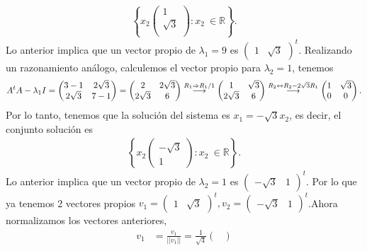 \documentclass[11pt,letterpaper]{article}
\newcommand{\mR}{\mathbb{R}}
\newcommand{\grstep}[2][\relax]{%
   \ensuremath{\mathrel{
       {\mathop{\longrightarrow}\limits^{#2\mathstrut}_{
                                     \begin{subarray}{l} #1 \end{subarray}}}}}}
\begin{document}
\begin{enumerate}
\begin{align*}
\left\{x_2\begin{pmatrix}
 1\\
 \sqrt{3}\\
\end{pmatrix}: x_2 \ \in \mR \right\}.
\end{align*}
Lo anterior implica que un vector propio de $\lambda_1=9$ es 
$\begin{pmatrix}
1 & \sqrt{3} 
\end{pmatrix}^t$. Realizando un razonamiento análogo, calculemos el vector propio para $\lambda_2=1$, tenemos 
\begin{align*}
A^tA-\lambda_1I=\begin{pmatrix}
3-1 & 2 \sqrt{3} \\
2\sqrt{3} &7-1
\end{pmatrix}=\begin{pmatrix}
2 & 2 \sqrt{3} \\
2\sqrt{3} &6
\end{pmatrix}
\grstep[]{R_1 \Rightarrow R_1/1}
%
\begin{pmatrix}
1 & \sqrt{3} \\
2\sqrt{3} &6
\end{pmatrix}
%
\grstep[]{R_2 \leftrightarrow R_2-2\sqrt{3}R_1}
%
\begin{pmatrix}
1 & \sqrt{3} \\
0 &0
\end{pmatrix}.
\end{align*}
Por lo tanto, tenemos que la solución del sistema es $x_1=-\sqrt{3}x_2$, es decir, el conjunto solución es
\begin{align*}
\left\{x_2\begin{pmatrix}
-\sqrt{3}\\
1
\end{pmatrix}: x_2 \ \in \mR \right\}.
\end{align*}
Lo anterior implica que un vector propio de $\lambda_2=1$ es 
$\begin{pmatrix}
-\sqrt{3}& 1
\end{pmatrix}^t$. 
Por lo que ya tenemos 2 vectores propios $v_1=\begin{pmatrix}
1 & \sqrt{3} 
\end{pmatrix}^t, v_2=\begin{pmatrix}
-\sqrt{3}& 1
\end{pmatrix}^t$.Ahora normalizamos los vectores anteriores,
\begin{align*}
v_1&= \frac{v_1}{||v_1||} =\frac{1}{\sqrt{4}} \begin{pmatrix}

\end{pmatrix}
\end{align*}
\end{enumerate}
\end{document}
